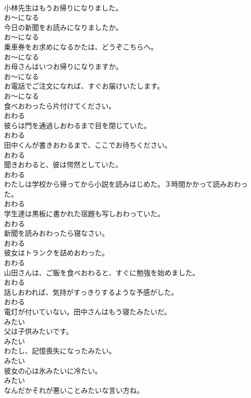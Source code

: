 \documentclass[8pt]{extreport}
\begin{document}
\begin{CJK}{UTF8}{min}
\\	小林先生はもうお帰りになりました。	
\\	お～になる
\\	今日の新聞をお読みになりましたか。	
\\	お～になる
\\	乗車券をお求めになるかたは、どうぞこちらへ。	
\\	お～になる
\\	お母さんはいつお帰りになりますか。	
\\	お～になる
\\	お電話でご注文になれば、すぐお届けいたします。	
\\	お～になる
\\	食べおわったら片付けてください。	
\\	おわる
\\	彼らは門を通過しおわるまで目を閉じていた。	
\\	おわる
\\	田中くんが書きおわるまで、ここでお待ちください。	
\\	おわる
\\	聞きおわると、彼は愕然としていた。	
\\	おわる
\\	わたしは学校から帰ってから小説を読みはじめた。３時間かかって読みおわった。	
\\	おわる
\\	学生達は黒板に書かれた宿題も写しおわっていた。	
\\	おわる
\\	新聞を読みおわったら寝なさい。	
\\	おわる
\\	彼女はトランクを詰めおわった。	
\\	おわる
\\	山田さんは、ご飯を食べおわると、すぐに勉強を始めました。	
\\	おわる
\\	話しおわれば、気持がすっきりするような予感がした。	
\\	おわる
\\	電灯が付いていない。田中さんはもう寝たみたいだ。	
\\	みたい
\\	父は子供みたいです。	
\\	みたい
\\	わたし、記憶喪失になったみたい。	
\\	みたい
\\	彼女の心は氷みたいに冷たい。	
\\	みたい
\\	なんだかそれが悪いことみたいな言い方ね。	

\end{CJK}
\end{document}
